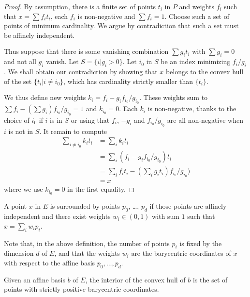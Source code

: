 \begin{proof}
  \leanok
  By assumption, there is a finite set of points $t_i$ in $P$ and
  weights $f_i$ such that $x = \sum f_i t_i$, each $f_i$ is non-negative
  and $\sum f_i = 1$.
  Choose such a set of points of minimum cardinality. We argue by
  contradiction that such a set must be affinely independent.

  Thus suppose that there is some vanishing combination $\sum g_i t_i$ with
  $\sum g_i = 0$ and not all $g_i$ vanish.
  Let $S = \{i | g_i > 0\}$.
  Let $i_0$ in $S$ be an index minimizing $f_i/g_i$. We shall obtain our
  contradiction by showing that $x$ belongs to the convex hull of the set
  $\{t_i| i \ne i_0\}$, which has cardinality strictly smaller than
  $\{t_i\}$.

  We thus define new weights $k_i = f_i - g_i f_{i_0}/g_{i_0}$.
  These weights sum to $\sum f_i - (\sum g_i)f_{i_0}/g_{i_0} = 1$
  and $k_{i_0} = 0$.
  Each $k_i$ is non-negative, thanks to the choice of $i_0$ if
  $i$ is in $S$ or using that $f_i$, $-g_i$ and $f_{i_0}/g_{i_0}$
  are all non-negative when $i$ is not in $S$.
  It remain to compute
  \begin{align*}
    \sum_{i ≠ i_0} k_i t_i &= \sum_i k_i t_i \\
      &= \sum_i (f_i - g_i f_{i_0}/g_{i_0}) t_i  \\
      &= \sum_i f_i t_i - \left(\sum_i g_i t_i\right)f_{i_0}/g_{i_0})   \\
      &= x
  \end{align*}
  where we use $k_{i_0} = 0$ in the first equality.
\end{proof}


\begin{definition}
  \label{def:surrounds_points}
  \leanok
  A point $x$ in $E$
  is surrounded by points $p_0$, \dots, $p_d$ if those points are
  affinely independent and there exist weights $w_i ∈ (0, 1)$ with sum $1$
  such that $x = \sum_i w_i p_i$.
\end{definition}

Note that, in the above definition, the number of points $p_i$ is fixed
by the dimension $d$ of $E$, and that the weights $w_i$ are the barycentric
coordinates of $x$ with respect to the affine basis $p_0, \ldots, p_d$.

\begin{lemma}
  \label{lem:interior_chab}
  \leanok
  Given an affine basis $b$ of $E$, the interior of the convex hull of
  $b$ is the set of points with strictly positive barycentric coordinates.
\end{lemma}

